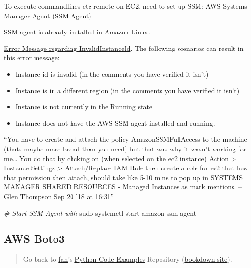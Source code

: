\documentclass[
]{book}
\newenvironment{Shaded}{\begin{snugshade}}{\end{snugshade}}
\newcommand{\CommentTok}[1]{\textcolor[rgb]{0.56,0.35,0.01}{\textit{#1}}}
\newcommand{\FunctionTok}[1]{\textcolor[rgb]{0.00,0.00,0.00}{#1}}
\newcommand{\NormalTok}[1]{#1}
\providecommand{\tightlist}{%
  \setlength{\itemsep}{0pt}\setlength{\parskip}{0pt}}
\begin{document}
To execute commandlines etc remote on EC2, need to set up SSM: AWS Systems Manager Agent (\href{https://docs.aws.amazon.com/systems-manager/latest/userguide/ssm-agent.html}{SSM Agent})

SSM-agent is already installed in Amazon Linux.

\href{https://stackoverflow.com/questions/47034797/invalidinstanceid-an-error-occurred-invalidinstanceid-when-calling-the-sendco}{Error Message regarding InvalidInstanceId}. The following scenarios can result in this error message:

\begin{itemize}
\tightlist
\item
  Instance id is invalid (in the comments you have verified it isn't)
\item
  Instance is in a different region (in the comments you have verified it isn't)
\item
  Instance is not currently in the Running state
\item
  Instance does not have the AWS SSM agent installed and running.
\end{itemize}

``You have to create and attach the policy AmazonSSMFullAccess to the machine (thats maybe more broad than you need) but that was why it wasn't working for me\ldots{} You do that by clicking on (when selected on the ec2 instance) Action \textgreater{} Instance Settings \textgreater{} Attach/Replace IAM Role then create a role for ec2 that has that permission then attach, should take like 5-10 mins to pop up in SYSTEMS MANAGER SHARED RESOURCES - Managed Instances as mark mentions. -- Glen Thompson Sep 20 '18 at 16:31''

\begin{Shaded}
\begin{Highlighting}[]
\CommentTok{# Start SSM Agent with}
\FunctionTok{sudo}\NormalTok{ systemctl start amazon-ssm-agent}
\end{Highlighting}
\end{Shaded}

\hypertarget{aws-boto3}{%
\subsection{AWS Boto3}\label{aws-boto3}}

\begin{quote}
Go back to \href{http://fanwangecon.github.io/}{fan}'s \href{https://fanwangecon.github.io/pyfan/}{Python Code Examples} Repository (\href{https://fanwangecon.github.io/pyfan/bookdown}{bookdown site}).
\end{quote}
\end{document}
